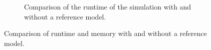\begin{figure}
\begin{subfigure}{.45\textwidth}
{
}
\caption{Comparison of the runtime of the simulation with and without a reference model.}
\label{fig:res_runtime}
\end{subfigure}
\label{fig:sizespeed_comp}
\caption{Comparison of runtime and memory with and without a reference model.}
\end{figure}



%
%
%
%



